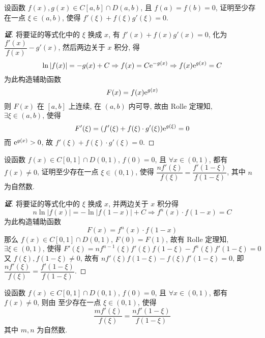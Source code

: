 \begin{example}
    设函数 $f(x),g(x)\in C[a,b]\cap D(a,b)$, 且 $f(a)=f(b)=0$, 证明至少存在一点 $\xi\in(a,b)$, 
    使得 $f'(\xi)+f(\xi)g'(\xi)=0.$
\end{example}
\begin{proof}[{\songti \textbf{证}}]
    将要证的等式化中的 $\xi$ 换成 $x$, 有 $f'(x)+f(x)g'(x)=0$, 化为 $\dfrac{f'(x)}{f(x)}-g'(x)$, 
    然后两边关于 $x$ 积分, 得 $$\ln|f(x)|=-g(x)+C\Rightarrow f(x)=C\mathrm{e} ^{-g(x)}\Rightarrow f(x)\mathrm{e} ^{g(x)}=C$$
    为此构造辅助函数
    $$F(x)=f(x)\mathrm{e} ^{g(x)}$$
    则 $F(x)$ 在 $[a,b]$ 上连续, 在 $(a,b)$ 内可导, 故由 Rolle 定理知, $\exists\xi\in(a,b)\text{, 使得 }$
    $$F'(\xi)=(f'(\xi)+f(\xi)\cdot g'(\xi))\mathrm{e} ^{g(\xi)}=0$$
    而 $\mathrm{e} ^{g(x)}>0$, 故 $f'(\xi)+f(\xi)\cdot g'(\xi)=0.$
\end{proof}

\begin{example}
    设函数 $f(x)\in C[0,1]\cap D(0,1)$, $f(0)=0$, 且 $\forall x\in(0,1)$, 都有 $f(x)\neq0$, 证明至少存在一点 $\xi\in(0,1)$, 使得
    $\dfrac{nf'(\xi)  }{f(\xi)  }=\dfrac{f'(1-\xi)  }{f(1-\xi)  }$, 其中 $n$ 为自然数.
\end{example}
\begin{proof}[{\songti \textbf{证}}]
    将要证的等式化中的 $\xi$ 换成 $x$, 并两边关于 $x$ 积分得
    $$n\ln \left| f(x)  \right| =-\ln \left| f\left( 1-x\right) \right| +C\Rightarrow f^{n}(x)  \cdot f\left( 1-x\right) =C$$
    为此构造辅助函数 $$F(x)=f^{n}(x)  \cdot f\left( 1-x\right)$$
    那么 $f(x)\in C[0,1]\cap D(0,1)$, $F(0)=F(1)$, 故有 Rolle 定理知, 
    $$\exists\xi\in(0,1)\text{, 使得 }F'(\xi)=nf^{n-1}(\xi) f'(\xi) f(1-\xi)  -f^{n}(\xi)  f'(1-\xi)  =0$$
    又 $f(\xi),f(1-\xi)\neq0$, 故有 $nf'(\xi)  f(1-\xi)  -f(\xi)  f'(1-\xi)  =0$, 
    即 $\dfrac{nf'(\xi)  }{f(\xi)  }=\dfrac{f'(1-\xi)  }{f(1-\xi)  }.$
\end{proof}
\begin{inference}
    设函数 $f(x)\in C[0,1]\cap D(0,1)$, $f(0)=0$, 且 $\forall x\in(0,1)$, 都有 $f(x)\neq0$, 则由
    至少存在一点 $\xi\in(0,1)$, 使得
    $$\dfrac{mf'(\xi)  }{f(\xi)  }=\dfrac{nf'(1-\xi)  }{f(1-\xi)  }$$
    其中 $m,n$ 为自然数.
\end{inference}

